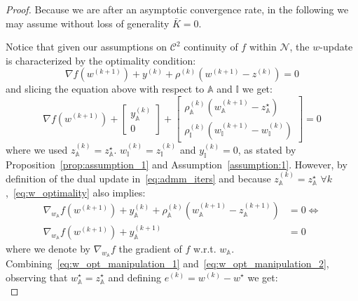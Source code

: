 \documentclass[10pt,a4paper]{amsart}
\begin{document}
\begin{proof}
Because we are after an asymptotic convergence rate, in the following we may assume without loss of generality $\bar{K} = 0$.

Notice that given our assumptions on $\mathcal{C}^2$ continuity of $f$ within $\mathcal{N}$, the $w$-update is characterized by the optimality condition:
\begin{equation}
\label{eq:w_optimality}
\nabla f(w^{(k+1)}) + y^{(k)} + \rho^{(k)} (w^{(k+1)} - z^{(k)}) = 0
\end{equation}
and slicing the equation above with respect to $\mathbb{A}$ and $\mathbb{I}$ we get:
\begin{equation}
\label{eq:w_opt_manipulation_1}
\nabla f(w^{(k+1)}) + \begin{bmatrix}
    y_{\mathbb{A}}^{(k)} \\
    0
\end{bmatrix} + \begin{bmatrix}
    \rho_{\mathbb{A}}^{(k)} (w_{\mathbb{A}}^{(k+1)} - z_{\mathbb{A}}^{\star}) \\
    \rho_{\mathbb{I}}^{(k)} (w_{\mathbb{I}}^{(k+1)} - w_{\mathbb{I}}^{(k)})
\end{bmatrix} = 0
\end{equation}
where we used $z^{(k)}_\mathbb{A} = z_\mathbb{A}^{\star}$. $w_\mathbb{I}^{(k)} = z_\mathbb{I}^{(k)}$ and $y_{\mathbb{I}}^{(k)} = 0$, as stated by Proposition~\ref{prop:assumption_1} and Assumption~\ref{assumption:1}. However, by definition of the dual update in~\eqref{eq:admm_iters} and because $z_\mathbb{A}^{(k)} = z_\mathbb{A}^{\star}$ $\forall k$,~\eqref{eq:w_optimality} also implies:
\begin{equation}
\label{eq:w_opt_manipulation_2}
\begin{aligned}
\nabla_{w_{\mathbb{A}}} f(w^{(k+1)}) + y_{\mathbb{A}}^{(k)} + \rho_{\mathbb{A}}^{(k)} (w_{\mathbb{A}}^{(k+1)} - z_{\mathbb{A}}^{(k+1)}) &= 0 \iff \\
\nabla_{w_{\mathbb{A}}} f(w^{(k+1)}) + y_{\mathbb{A}}^{(k+1)} &= 0
\end{aligned}
\end{equation}
where we denote by $\nabla_{w_{\mathbb{A}}}f$ the gradient of $f$ w.r.t. $w_{\mathbb{A}}$. Combining~\eqref{eq:w_opt_manipulation_1} and~\eqref{eq:w_opt_manipulation_2}, observing that $w_{\mathbb{A}}^{\star} = z_{\mathbb{A}}^{\star}$ and defining $e^{(k)} = w^{(k)} - w^{\star}$ we get:
\begin{equation}
\label{eq:gradients_errors}

\end{equation}
\end{proof}
\end{document}
